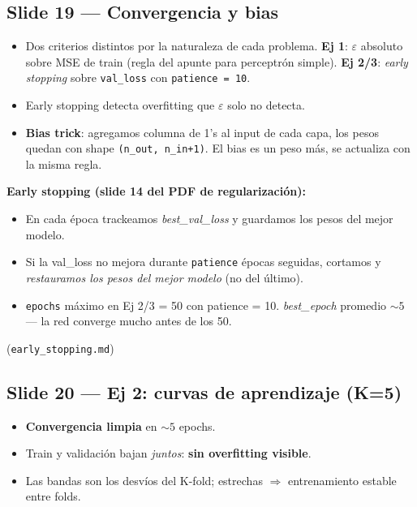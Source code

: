\documentclass[11pt,a4paper]{article}
\newcommand{\nref}[1]{\textcolor{muted}{\small(\texttt{#1})}}
\begin{document}
\subsection{Slide 19 — Convergencia y bias}

\begin{decir}
\begin{itemize}[leftmargin=*,topsep=0pt]
  \item Dos criterios distintos por la naturaleza de cada problema. \textbf{Ej 1}:
        $\varepsilon$ absoluto sobre MSE de train (regla del apunte para
        perceptrón simple). \textbf{Ej 2/3}: \emph{early stopping} sobre
        \texttt{val\_loss} con \texttt{patience = 10}.
  \item Early stopping detecta overfitting que $\varepsilon$ solo no detecta.
  \item \textbf{Bias trick}: agregamos columna de 1's al input de cada capa,
        los pesos quedan con shape \texttt{(n\_out, n\_in+1)}. El bias es un
        peso más, se actualiza con la misma regla.
\end{itemize}
\end{decir}

\begin{nota}
\textbf{Early stopping (slide 14 del PDF de regularización):}
\begin{itemize}[leftmargin=*,topsep=2pt]
  \item En cada época trackeamos \emph{best\_val\_loss} y guardamos los pesos del
        mejor modelo.
  \item Si la val\_loss no mejora durante \texttt{patience} épocas seguidas,
        cortamos y \emph{restauramos los pesos del mejor modelo} (no del último).
  \item \texttt{epochs} máximo en Ej 2/3 = 50 con patience = 10. \emph{best\_epoch}
        promedio $\sim 5$ — la red converge mucho antes de los 50.
\end{itemize}
\nref{early\_stopping.md}
\end{nota}

\subsection{Slide 20 — Ej 2: curvas de aprendizaje (K=5)}

\begin{decir}
\begin{itemize}[leftmargin=*,topsep=0pt]
  \item \textbf{Convergencia limpia} en $\sim 5$ epochs.
  \item Train y validación bajan \emph{juntos}: \textbf{sin overfitting visible}.
  \item Las bandas son los desvíos del K-fold; estrechas $\Rightarrow$ entrenamiento
        estable entre folds.
\end{itemize}
\end{decir}
\end{document}
